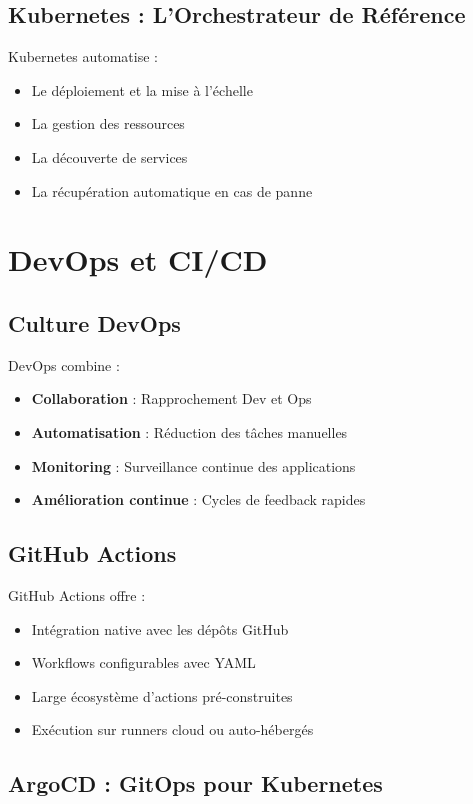 \subsection{Kubernetes : L'Orchestrateur de Référence}

Kubernetes automatise :
\begin{itemize}
    \item Le déploiement et la mise à l'échelle
    \item La gestion des ressources
    \item La découverte de services
    \item La récupération automatique en cas de panne
\end{itemize}

\section{DevOps et CI/CD}

\subsection{Culture DevOps}

DevOps combine :
\begin{itemize}
    \item \textbf{Collaboration} : Rapprochement Dev et Ops
    \item \textbf{Automatisation} : Réduction des tâches manuelles
    \item \textbf{Monitoring} : Surveillance continue des applications
    \item \textbf{Amélioration continue} : Cycles de feedback rapides
\end{itemize}

\subsection{GitHub Actions}

GitHub Actions offre :
\begin{itemize}
    \item Intégration native avec les dépôts GitHub
    \item Workflows configurables avec YAML
    \item Large écosystème d'actions pré-construites
    \item Exécution sur runners cloud ou auto-hébergés
\end{itemize}

\subsection{ArgoCD : GitOps pour Kubernetes}


